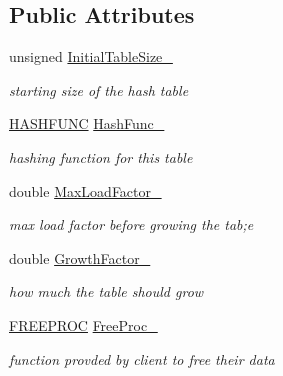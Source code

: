 \subsection*{Public Attributes}
\begin{DoxyCompactItemize}
\item 
\hypertarget{structChHashTable_1_1HTConfig_a988a6c256aac85b4eb127d4a419e331b}{unsigned \hyperlink{structChHashTable_1_1HTConfig_a988a6c256aac85b4eb127d4a419e331b}{Initial\-Table\-Size\-\_\-}}\label{structChHashTable_1_1HTConfig_a988a6c256aac85b4eb127d4a419e331b}

\begin{DoxyCompactList}\small\item\em starting size of the hash table \end{DoxyCompactList}\item 
\hypertarget{structChHashTable_1_1HTConfig_a366226aed0b020f6a5cf097adc3510e3}{\hyperlink{ChHashTable_8h_a2e5c3d6d9eb14baf05abe0760e4a6a5a}{H\-A\-S\-H\-F\-U\-N\-C} \hyperlink{structChHashTable_1_1HTConfig_a366226aed0b020f6a5cf097adc3510e3}{Hash\-Func\-\_\-}}\label{structChHashTable_1_1HTConfig_a366226aed0b020f6a5cf097adc3510e3}

\begin{DoxyCompactList}\small\item\em hashing function for this table \end{DoxyCompactList}\item 
\hypertarget{structChHashTable_1_1HTConfig_a1c5cd55bdcbcf32f6be5ee2723e4e70d}{double \hyperlink{structChHashTable_1_1HTConfig_a1c5cd55bdcbcf32f6be5ee2723e4e70d}{Max\-Load\-Factor\-\_\-}}\label{structChHashTable_1_1HTConfig_a1c5cd55bdcbcf32f6be5ee2723e4e70d}

\begin{DoxyCompactList}\small\item\em max load factor before growing the tab;e \end{DoxyCompactList}\item 
\hypertarget{structChHashTable_1_1HTConfig_aaa8f17981853e0ad55c96154b1b55bce}{double \hyperlink{structChHashTable_1_1HTConfig_aaa8f17981853e0ad55c96154b1b55bce}{Growth\-Factor\-\_\-}}\label{structChHashTable_1_1HTConfig_aaa8f17981853e0ad55c96154b1b55bce}

\begin{DoxyCompactList}\small\item\em how much the table should grow \end{DoxyCompactList}\item 
\hypertarget{structChHashTable_1_1HTConfig_a4d257f01f02eca4cab5c8b84b40f54d4}{\hyperlink{classChHashTable_a4cdeb8c440ef53bf15304c154f2ca950}{F\-R\-E\-E\-P\-R\-O\-C} \hyperlink{structChHashTable_1_1HTConfig_a4d257f01f02eca4cab5c8b84b40f54d4}{Free\-Proc\-\_\-}}\label{structChHashTable_1_1HTConfig_a4d257f01f02eca4cab5c8b84b40f54d4}

\begin{DoxyCompactList}\small\item\em function provded by client to free their data \end{DoxyCompactList}\end{DoxyCompactItemize}


